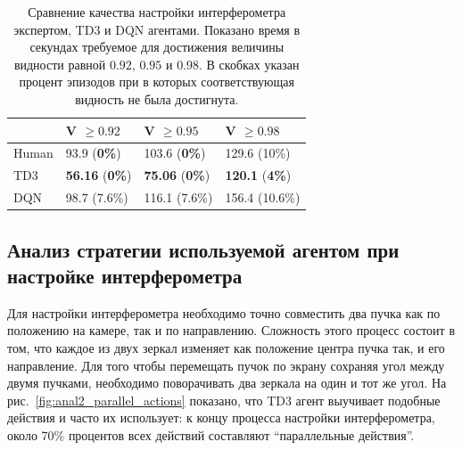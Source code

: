 \begin{table} [htbp]
    \centering
    \begin{threeparttable}
        \caption{Сравнение качества настройки интерферометра экспертом, TD3 и DQN агентами. Показано время в секундах требуемое для достижения величины видности равной $0.92$, $0.95$ и $0.98$. В скобках указан процент эпизодов при в которых соответствующая видность не была достигнута.}\label{tab:human}
        \begin{tabular}{| p{4cm} || p{4cm} || p{4cm} || p{4cm} |}
            \hline
            \hline
            &V $\ge 0.92$ & V $\ge 0.95$ & V $\ge 0.98$ \\
            \hline
            Human &  93.9 (\textbf{0\%})  & 103.6 (\textbf{0\%}) & 129.6 (10\%)\\
            TD3 &  \textbf{56.16} (\textbf{0\%}) & \textbf{75.06} (\textbf{0\%}) & \textbf{120.1} (\textbf{4\%})\\
            DQN &  98.7 (7.6\%) & 116.1 (7.6\%) & 156.4 (10.6\%)\\
            \hline
            \hline
        \end{tabular}
    \end{threeparttable}
\end{table}

\subsection{Анализ стратегии используемой агентом при настройке интерферометра}\label{sec:ch2/sec8/subsec2}

Для настройки интерферометра необходимо точно совместить два пучка как по положению на камере, так и по направлению. Сложность этого процесс состоит в том, что каждое из двух зеркал изменяет как положение центра пучка так, и его направление. Для того чтобы перемещать пучок по экрану сохраняя угол между двумя пучками, необходимо поворачивать два зеркала на один и тот же угол. На рис.~\ref{fig:anal2_parallel_actions} показано, что TD3 агент выучивает подобные действия и часто их использует: к концу процесса настройки интерферометра, около 70\% процентов всех действий составляют ``параллельные действия''. 

